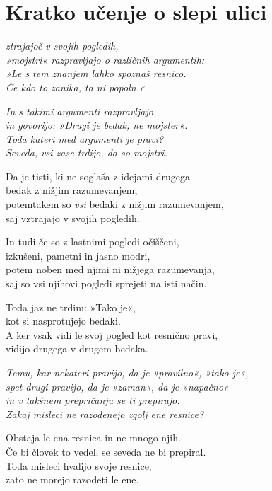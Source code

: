 \cleartorecto
{}
\chapter{Kratko učenje o slepi ulici}

\emph{ztrajajoč v svojih pogledih,\\
»mojstri« razpravljajo o različnih argumentih:\\
»Le s tem znanjem lahko spoznaš resnico.\\
Če kdo to zanika, ta ni popoln.«}

\emph{In s takimi argumenti razpravljajo}\\
\emph{in govorijo: »Drugi je bedak, ne mojster«.}\\
\emph{Toda kateri med argumenti je pravi?}\\
\emph{Seveda, vsi zase trdijo, da so mojstri.}

\clearpage

Da je tisti, ki ne soglaša z idejami drugega\\
bedak z nižjim razumevanjem,\\
potemtakem so \emph{vsi} bedaki z nižjim razumevanjem,\\
saj vztrajajo v svojih pogledih.

In tudi če so z lastnimi pogledi očiščeni,\\
izkušeni, pametni in jasno modri,\\
potem noben med njimi ni nižjega razumevanja,\\
saj so vsi njihovi pogledi sprejeti na isti način.

Toda jaz ne trdim: »Tako je«,\\
kot si nasprotujejo bedaki.\\
A ker vsak vidi le svoj pogled kot resnično pravi,\\
vidijo drugega v drugem bedaka.

\emph{Temu, kar nekateri pravijo, da je »pravilno«, »tako je«,\\
spet drugi pravijo, da je »zaman«, da je »napačno«\\
in v takšnem prepričanju se ti prepirajo.\\
Zakaj misleci ne razodenejo zgolj ene resnice?}

Obstaja le ena resnica in ne mnogo njih.\\
Če bi človek to vedel, se seveda ne bi prepiral.\\
Toda misleci hvalijo svoje resnice,\\
zato ne morejo razodeti le ene.

